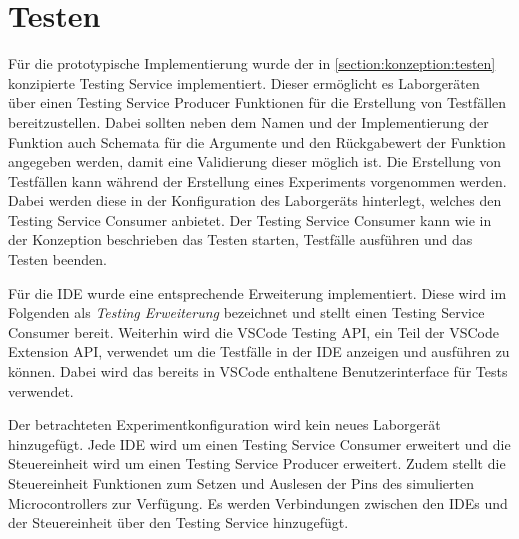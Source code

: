 \section{Testen}\label{section:prototypische-implementierung:testen}


Für die prototypische Implementierung wurde der in \autoref{section:konzeption:testen} konzipierte Testing Service implementiert. Dieser ermöglicht es Laborgeräten über einen Testing Service Producer Funktionen für die Erstellung von Testfällen bereitzustellen. Dabei sollten neben dem Namen und der Implementierung der Funktion auch Schemata für die Argumente und den Rückgabewert der Funktion angegeben werden, damit eine Validierung dieser möglich ist. Die Erstellung von Testfällen kann während der Erstellung eines Experiments vorgenommen werden. Dabei werden diese in der Konfiguration des Laborgeräts hinterlegt, welches den Testing Service Consumer anbietet. Der Testing Service Consumer kann wie in der Konzeption beschrieben das Testen starten, Testfälle ausführen und das Testen beenden.

Für die IDE wurde eine entsprechende Erweiterung implementiert. Diese wird im Folgenden als \textit{Testing Erweiterung} bezeichnet und stellt einen Testing Service Consumer bereit. Weiterhin wird die VSCode Testing API, ein Teil der VSCode Extension API, verwendet um die Testfälle in der IDE anzeigen und ausführen zu können. Dabei wird das bereits in VSCode enthaltene Benutzerinterface für Tests verwendet.

Der betrachteten Experimentkonfiguration wird kein neues Laborgerät hinzugefügt. Jede IDE wird um einen Testing Service Consumer erweitert und die Steuereinheit wird um einen Testing Service Producer erweitert. Zudem stellt die Steuereinheit Funktionen zum Setzen und Auslesen der Pins des simulierten Microcontrollers zur Verfügung. Es werden Verbindungen zwischen den IDEs und der Steuereinheit über den Testing Service hinzugefügt.